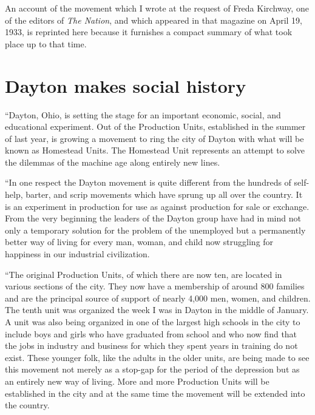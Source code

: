 \documentclass{book}
\begin{document}
An account of the movement which I wrote at the request of Freda Kirchway, one of the editors of \emph{The Nation}, and which appeared in that magazine on April 19, 1933, is reprinted here because it furnishes a compact summary of what took place up to that time.

\section*{Dayton makes social history}
“Dayton, Ohio, is setting the stage for an important economic, social, and educational experiment. Out of the Production Units, established in the summer of last year, is growing a movement to ring the city of Dayton with what will be known as Homestead Units. The Homestead Unit represents an attempt to solve the dilemmas of the machine age along entirely new lines.

“In one respect the Dayton movement is quite different from the hundreds of self-help, barter, and scrip movements which have sprung up all over the country. It is an experiment in production for use as against production for sale or exchange. From the very beginning the leaders of the Dayton group have had in mind not only a temporary solution for the problem of the unemployed but a permanently better way of living for every man, woman, and child now struggling for happiness in our industrial civilization.

“The original Production Units, of which there are now ten, are located in various sections of the city. They now have a membership of around 800 families and are the principal source of support of nearly 4,000 men, women, and children. The tenth unit was organized the week I was in Dayton in the middle of January. A unit was also being organized in one of the largest high schools in the city to include boys and girls who have graduated from school and who now find that the jobs in industry and business for which they spent years in training do not exist. These younger folk, like the adults in the older units, are being made to see this movement not merely as a stop-gap for the period of the depression but as an entirely new way of living. More and more Production Units will be established in the city and at the same time the movement will be extended into the country.
\end{document}
